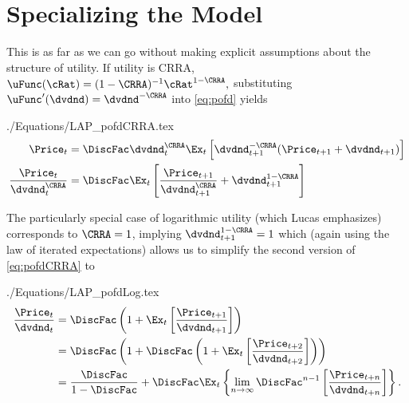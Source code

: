 \documentclass{\handout}
\begin{document}
\section{Specializing the Model}

This is as far as we can go without making explicit assumptions about the structure
of utility.  If utility is CRRA, $\uFunc(\cRat)=(1-\CRRA)^{-1}\cRat^{1-\CRRA},$ substituting $\uFunc^{\prime}(\dvdnd)=\dvdnd^{-\CRRA}$ into \eqref{eq:pofd} yields
\begin{verbatimwrite}{./Equations/LAP_pofdCRRA.tex}
\begin{equation}\begin{gathered}\begin{aligned}
      \Price_{t} & =  \DiscFac \dvdnd_{t}^{\CRRA} \Ex_{t}\left[\dvdnd_{t+1}^{-\CRRA}(\Price_{t+1}+\dvdnd_{t+1})\right] \label{eq:pofdCRRA}
\\ \frac{\Price_{t}}{\dvdnd_{t}^{\CRRA}} & =  \DiscFac \Ex_{t}\left[\frac{\Price_{t+1}}{\dvdnd_{t+1}^{\CRRA}}+\dvdnd_{t+1}^{1-\CRRA}\right] 
\end{aligned}\end{gathered}\end{equation}
\end{verbatimwrite}



The particularly special case of logarithmic utility (which Lucas emphasizes) corresponds to $\CRRA=1$, implying $\dvdnd_{t+1}^{1-\CRRA}=1$ which (again using the law of iterated expectations) allows us to simplify the second version of \eqref{eq:pofdCRRA} to
\begin{verbatimwrite}{./Equations/LAP_pofdLog.tex}
\begin{equation*}\begin{gathered}\begin{aligned}
\frac{\Price_{t}}{\dvdnd_{t}} & =  \DiscFac \left(1+\Ex_{t} \left[\frac{{\Price}_{t+1}}{\dvdnd_{t+1}}\right]\right)  \label{eq:pofdLog}
\\ & =  \DiscFac \left(1+\DiscFac \left(1+\Ex_{t}\left[\frac{{\Price}_{t+2}}{\dvdnd_{t+2}}\right]\right)\right)
\\ & =  \frac{\DiscFac}{1-\DiscFac} + \DiscFac \Ex_{t}\left\{\lim_{n\rightarrow \infty}\DiscFac^{n-1}\left[\frac{\Price_{t+n}}{\dvdnd_{t+n}}\right]\right\}.
\end{aligned}\end{gathered}\end{equation*}
\end{verbatimwrite}

\end{document}

